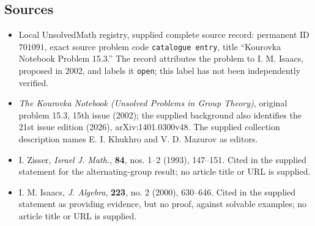 \documentclass[11pt]{article}
\begin{document}
\subsection{Sources}
\begin{itemize}
\item Local UnsolvedMath registry, supplied complete source record: permanent ID \(701091\), exact source problem code \texttt{catalogue entry}, title ``Kourovka Notebook Problem 15.3.'' The record attributes the problem to I. M. Isaacs, proposed in 2002, and labels it \texttt{open}; this label has not been independently verified.
\item \emph{The Kourovka Notebook (Unsolved Problems in Group Theory)}, original problem 15.3, 15th issue (2002); the supplied background also identifies the 21st issue edition (2026), arXiv:1401.0300v48. The supplied collection description names E. I. Khukhro and V. D. Mazurov as editors.
\item I. Zisser, \emph{Israel J. Math.}, \textbf{84}, nos. 1--2 (1993), 147--151. Cited in the supplied statement for the alternating-group result; no article title or URL is supplied.
\item I. M. Isaacs, \emph{J. Algebra}, \textbf{223}, no. 2 (2000), 630--646. Cited in the supplied statement as providing evidence, but no proof, against solvable examples; no article title or URL is supplied.
\end{itemize}
\end{document}
